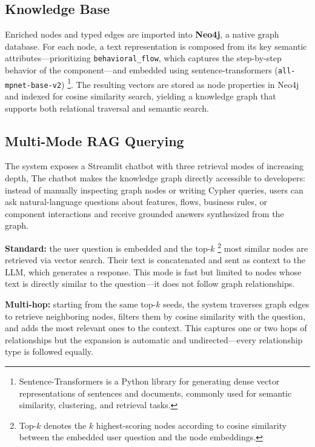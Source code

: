 \documentclass[sigconf]{acmart}
\begin{document}
\subsection{Knowledge Base}

Enriched nodes and typed edges are imported into \textbf{Neo4j}, a native graph database. For each node, a text representation is composed from its key semantic attributes---prioritizing \texttt{behavioral\_flow}, which captures the step-by-step behavior of the component---and embedded using sentence-transformers (\texttt{all-mpnet-base-v2}) \footnote{Sentence-Transformers is a Python library for generating dense vector representations of sentences and documents, commonly used for semantic similarity, clustering, and retrieval tasks.}. The resulting vectors are stored as node properties in Neo4j and indexed for cosine similarity search, yielding a knowledge graph that supports both relational traversal and semantic search.

\subsection{Multi-Mode RAG Querying}

The system exposes a Streamlit chatbot with three retrieval modes of increasing depth, The chatbot makes the knowledge graph directly accessible to developers: instead of manually inspecting graph nodes or writing Cypher queries, users can ask natural-language questions about features, flows, business rules, or component interactions and receive grounded answers synthesized from the graph.

\textbf{Standard:} the user question is embedded and the top-$k$ \footnote{Top-$k$ denotes the $k$ highest-scoring nodes according to cosine similarity between the embedded user question and the node embeddings.} most similar nodes are retrieved via vector search. Their text is concatenated and sent as context to the LLM, which generates a response. This mode is fast but limited to nodes whose text is directly similar to the question---it does not follow graph relationships.

\textbf{Multi-hop:} starting from the same top-$k$ seeds, the system traverses graph edges to retrieve neighboring nodes, filters them by cosine similarity with the question, and adds the most relevant ones to the context. This captures one or two hops of relationships but the expansion is automatic and undirected---every relationship type is followed equally.
\end{document}
